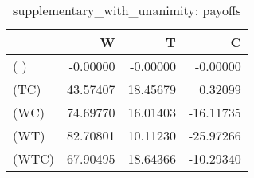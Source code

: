 \begin{table}
\centering
\caption{supplementary_with_unanimity: payoffs}
\begin{tabular}{lrrr}
\toprule
{} &        W &        T &         C \\
\midrule
( )   & -0.00000 & -0.00000 &  -0.00000 \\
(TC)  & 43.57407 & 18.45679 &   0.32099 \\
(WC)  & 74.69770 & 16.01403 & -16.11735 \\
(WT)  & 82.70801 & 10.11230 & -25.97266 \\
(WTC) & 67.90495 & 18.64366 & -10.29340 \\
\bottomrule
\end{tabular}
\end{table}
